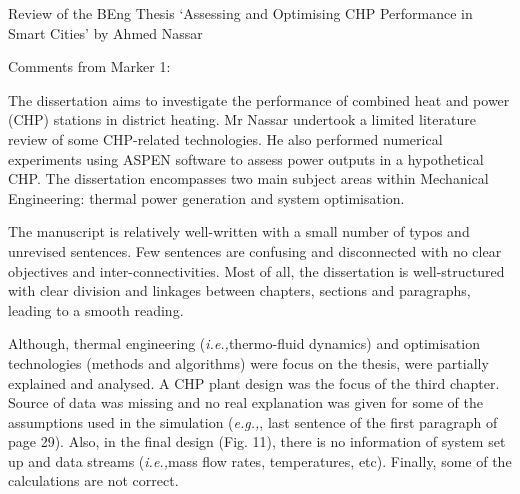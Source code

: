 \documentclass[14pt,twoside]{report}
\newcommand{\ie}{{\it i.e.,}}
\newcommand{\eg}{{\it e.g.,}}
\begin{document}
\vfill
\clearpage


\bigskip

\begin{center}
  {\Large Review of the BEng Thesis `Assessing and Optimising CHP Performance in Smart Cities' by Ahmed Nassar}
\end{center}

\noindent
{\Large Comments from Marker 1:}

The dissertation aims to investigate the performance of combined heat and power (CHP) stations in district heating. Mr Nassar undertook a limited literature review of some CHP-related technologies. He also performed numerical experiments using ASPEN software to assess power outputs in a hypothetical CHP. The dissertation encompasses two main subject areas within Mechanical Engineering: thermal power generation and system optimisation.

The manuscript is relatively well-written with a small number of typos and unrevised sentences. Few sentences are confusing and disconnected with no clear objectives and inter-connectivities. Most of all, the dissertation is well-structured with clear division and linkages between chapters, sections and paragraphs, leading to a smooth reading.

Although, thermal engineering (\ie thermo-fluid dynamics) and optimisation technologies (methods and algorithms) were focus on the thesis, were partially explained and analysed. A CHP plant design was the focus of the third chapter. Source of data was missing and no real explanation was given for some of the assumptions used in the simulation (\eg, last sentence of the first paragraph of page 29). Also, in the final design (Fig. 11), there is no information of system set up and data streams (\ie mass flow rates, temperatures, etc). Finally, some of the calculations are not correct.
\end{document}
